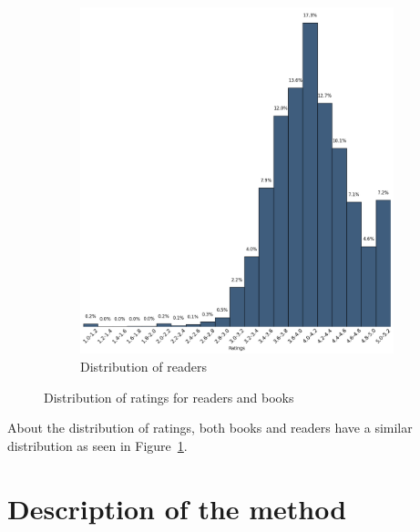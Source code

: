 \documentclass[11pt]{article}
\begin{document}
\begin{figure}
\begin{subfigure}[b]{0.5\textwidth}
                \includegraphics[width=\textwidth]{images/user_ratings}
                \caption{Distribution of readers}
        \end{subfigure}

        \caption{Distribution of ratings for readers and books}
        \label{fig:scatters}
\end{figure}

About the distribution of ratings, both books and readers have a similar distribution as seen in Figure~\ref{fig:scatters}.


\section{Description of the method}
\label{sec:method}
\end{document}
